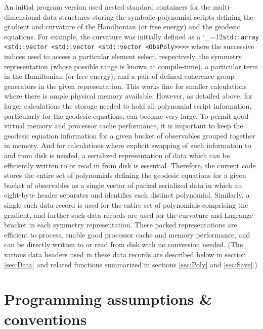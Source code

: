 \documentclass [12pt]{article}
\makeatletter
\renewcommand{\tt}{\begingroup\catcode`_=12\def\_{\string_}\tt@}
\newcommand{\tt@}[1]{\texttt{#1}\endgroup}
\makeatother
\begin{document}
An initial program version used nested 
standard containers for the multi-dimensional data structures
storing the symbolic polynomial scripts defining the
gradient and curvature of the Hamiltonian (or free energy)
and the geodesic equations.
For example, the curvature was initially 
defined as a
\tt{std::array <std::vector <std::vector <std::vector <ObsPoly>>>>}
where the successive indices used to access a particular element
select, respectively, the symmetry representation
(whose possible range is known at compile-time),
a particular term in the Hamiltonian (or free energy), and a pair of
defined coherence group generators in the given representation.
This works fine for smaller calculations where there is ample
physical memory available.
However, as detailed above, for larger calculations the storage
needed to hold all polynomial script information, particularly for
the geodesic equations, can become very large.
To permit good virtual memory and processor cache performance,
it is important to keep the
geodesic equation information for a given bucket of observables
grouped together in memory.
And for calculations where explicit swapping of such information
to and from disk is needed, a serialized representation of data which can
be efficiently written to or read in from disk is essential.
Therefore, the current code stores the entire 
set of polynomials defining the geodesic equations for
a given bucket of observables as a single
vector of packed serialized data in which an eight-byte header
separates and identifies each distinct polynomial.
Similarly, a single such data record is used for the
entire set of polynomials comprising the gradient,
and further such data records are used for the
curvature and Lagrange bracket in each symmetry representation.
These packed representations are efficient to process,
enable good processor cache and memory performance,
and can be directly written to or read from disk with no
conversion needed.
(The various data headers used in these data records
are described below in section \ref{sec:Data} and related functions
summarized in sections \ref{sec:Poly} and \ref{sec:Save}.)

\section {Programming assumptions \& conventions}
\end{document}
